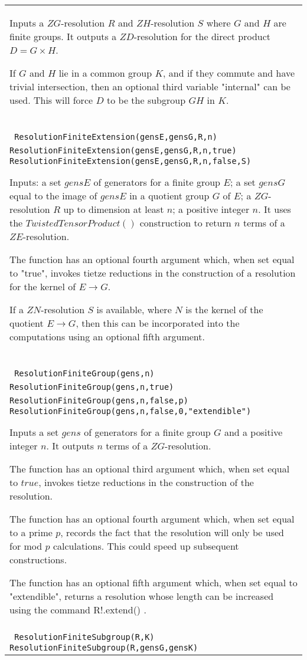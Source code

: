 \documentclass[a4paper,11pt]{report}
\begin{document}
{\begin{center}
\begin{tabular}{|l|}
 Inputs a $ZG$-resolution $R$ and $ZH$-resolution $S$ where $G$ and $H$ are finite groups. It outputs a $ZD$-resolution for the direct product $D=G×H$.

 If $G$ and $H$ lie in a common group $K$, and if they commute and have trivial intersection, then an optional third
variable "internal" can be used. This will force $D$ to be the subgroup $GH$ in $K$. \\
 \index{ResolutionFiniteExtension} \texttt{ ResolutionFiniteExtension(gensE,gensG,R,n)} {\nobreakspace} \texttt{ ResolutionFiniteExtension(gensE,gensG,R,n,true) } {\nobreakspace} \texttt{ ResolutionFiniteExtension(gensE,gensG,R,n,false,S) } 

 Inputs: a set $gensE$ of generators for a finite group $E$; a set $gensG$ equal to the image of $gensE$ in a quotient group $G$ of $E$; a $ZG$-resolution $R$ up to dimension at least $n$; a positive integer $n$. It uses the $TwistedTensorProduct()$ construction to return $n$ terms of a $ZE$-resolution.

 The function has an optional fourth argument which, when set equal to "true",
invokes tietze reductions in the construction of a resolution for the kernel
of $E \longrightarrow G$.

 If a $ZN$-resolution $S$ is available, where $N$ is the kernel of the quotient $E \longrightarrow G$, then this can be incorporated into the computations using an optional fifth
argument. \\
 \index{ResolutionFiniteGroup} \texttt{ ResolutionFiniteGroup(gens,n)} {\nobreakspace} \texttt{ ResolutionFiniteGroup(gens,n,true)} {\nobreakspace} \texttt{ ResolutionFiniteGroup(gens,n,false,p) } {\nobreakspace} \texttt{ ResolutionFiniteGroup(gens,n,false,0,"extendible") } 

 Inputs a set $gens$ of generators for a finite group $G$ and a positive integer $n$. It outputs $n$ terms of a $ZG$-resolution.

 The function has an optional third argument which, when set equal to $true$, invokes tietze reductions in the construction of the resolution. 

 The function has an optional fourth argument which, when set equal to a prime $p$, records the fact that the resolution will only be used for mod $p$ calculations. This could speed up subsequent constructions. 

 The function has an optional fifth argument which, when set equal to
"extendible", returns a resolution whose length can be increased using the
command R!.extend() . \\
 \index{ResolutionFiniteSubgroup} \texttt{ ResolutionFiniteSubgroup(R,K)} {\nobreakspace} \texttt{ ResolutionFiniteSubgroup(R,gensG,gensK)} 


\end{tabular}
\end{center}}
\end{document}
